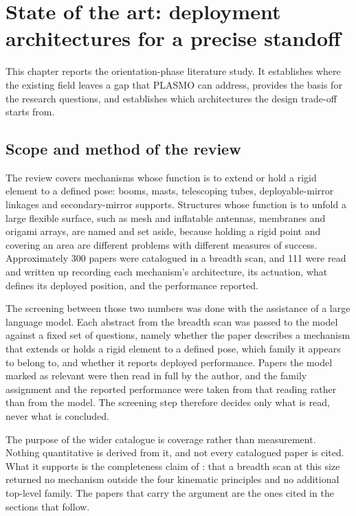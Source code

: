 \chapter{State of the art: deployment architectures for a precise standoff}
\label{chapter:sota}

This chapter reports the orientation-phase literature study. It establishes where the existing field leaves a gap that PLASMO can address, provides the basis for the research questions, and establishes which architectures the design trade-off starts from.

\section{Scope and method of the review}
\label{sec:review-method}

The review covers mechanisms whose function is to extend or hold a rigid element to a defined pose: booms, masts, telescoping tubes, deployable-mirror linkages and secondary-mirror supports. Structures whose function is to unfold a large flexible surface, such as mesh and inflatable antennas, membranes and origami arrays, are named and set aside, because holding a rigid point and covering an area are different problems with different measures of success. Approximately 300 papers were catalogued in a breadth scan, and 111 were read and written up recording each mechanism's architecture, its actuation, what defines its deployed position, and the performance reported.

The screening between those two numbers was done with the assistance of a large language model. Each abstract from the breadth scan was passed to the model against a fixed set of questions, namely whether the paper describes a mechanism that extends or holds a rigid element to a defined pose, which family it appears to belong to, and whether it reports deployed performance. Papers the model marked as relevant were then read in full by the author, and the family assignment and the reported performance were taken from that reading rather than from the model. The screening step therefore decides only what is read, never what is concluded.

The purpose of the wider catalogue is coverage rather than measurement. Nothing quantitative is derived from it, and not every catalogued paper is cited. What it supports is the completeness claim of : that a breadth scan at this size returned no mechanism outside the four kinematic principles and no additional top-level family. The papers that carry the argument are the ones cited in the sections that follow.

